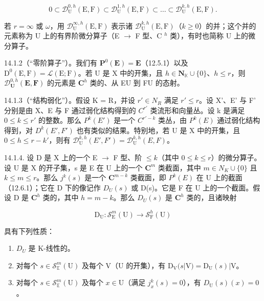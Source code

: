 \[
0 \subset \mathcal {D} _ {\mathrm{U}} ^ {0, h} (\mathrm{E}, \mathrm{F}) \subset \mathcal {D} _ {\mathrm{U}} ^ {1, h} (\mathrm{E}, \mathrm{F}) \subset \dots \subset \mathcal {D} _ {\mathrm{U}} ^ {k, h} (\mathrm{E}, \mathrm{F}).
\]

若 \(r=\infty\) 或 \(\omega\)，用 \(\mathcal{D}_{\mathrm{U}}^{\infty,h}(\mathrm{E},\mathrm{F})\) 表示诸 \(\mathcal{D}_{\mathrm{U}}^{k,h}(\mathrm{E},\mathrm{F})\)（\(k\geqslant0\)）的并；这个并的元素称为 U 上的有界阶微分算子（E \(\rightarrow\) F 型、C \(^{h}\) 类），有时也简称 U 上的微分算子。

14.1.2（“零阶算子”）。我们有 \(\mathbf{P}^0 (\mathbf{E}) = \mathbf{E}\)（12.5.1）以及 \(\mathrm{D}^0 (\mathrm{E},\mathrm{F}) = \mathcal{L}(\mathrm{E};\mathrm{F})\)。若 U 是 X 中的开集，且 \(h\in \mathbf{N}_{\mathbb{K}}\cup \{0\}\)、\(h\leqslant r\)，则 \(\mathcal{D}_{\mathbf{U}}^{0,h}(\mathbf{E},\mathbf{F})\) 的元素是 \(\mathbf{C}^h\) 类的、从 E\textbar U 到 F\textbar U 的态射。

14.1.3（“结构弱化”）。假设 K = R，并设 \(r' \in N_{R}\) 满足 \(r' \leqslant r\)。设 X'、E' 与 F' 分别是由 X、E 与 F 通过弱化结构得到的 \(C^{r'}\) 类流形和向量丛。设 k 是满足 \(0 \leqslant k \leqslant r'\) 的整数。那么 \(P^{k}(E')\) 是一个 \(C^{r'-k}\) 类丛，由 \(P^{k}(E)\) 通过弱化结构得到，对 \(D^{k}(E', F')\) 也有类似的结果。特别地，若 U 是 X 中的开集，且 \(0 \leqslant h \leqslant r - k'\)，则有 \(\mathcal{D}_{\mathrm{U}}^{k,h}(E', F') = \mathcal{D}_{\mathrm{U}}^{k,h}(E, F)\)。

14.1.4. 设 D 是 X 上的一个 E \(\to\) F 型、阶 \(\leqslant k\)（其中 \(0 \leqslant k \leqslant r\)）的微分算子。设 U 是 X 的开子集，s 是 E 在 U 上的一个 \(\mathbf{C}^{m}\) 类截面，其中 \(m \in N _{K} \cup \{0\}\) 且 \(k \leqslant m \leqslant r\)。那么 \(j^{k}(s)\) 是一个 \(\mathbf{C}^{m-k}\) 类截面，即 \(P^{k}(E)\) 在 U 上的截面（12.6.1）；它在 D 下的像记作 \(D_{U}(s)\) 或 D(s)。它是 F 在 U 上的一个截面。假设 D 是 \(\mathbf{C}^{h}\) 类的，其中 \(h=m-k\)。那么 \(D_{U}(s)\) 是 \(\mathbf{C}^{h}\) 类的，且诸映射

\[
\mathrm{D} _ {\mathrm{U}} \colon \mathcal {S} _ {\mathrm{E}} ^ {m} (\mathrm{U}) \rightarrow \mathcal {S} _ {\mathrm{F}} ^ {h} (\mathrm{U})
\]

具有下列性质：

\begin{enumerate}
\def\labelenumi{(\arabic{enumi})}
\item
  \(D_{U}\) 是 K-线性的。
\item
  对每个 \(s \in \mathcal{S}_{\mathbb{E}}^{m}(\mathrm{U})\) 及每个 \(\mathrm{V}\)（\(\mathrm{U}\) 的开集），有 \(\mathrm{D}_{\mathrm{V}}(s|\mathrm{V}) = \mathrm{D}_{\mathrm{U}}(s)|\mathrm{V}\)。
\item
  对每个 \(s \in \mathcal{S}_{\mathbb{E}}^{m}(\mathrm{U})\) 及每个 \(x \in \mathrm{U}\)（满足 \(j_{x}^{k}(s) = 0\)），有 \(D_{\mathrm{U}}(s)(x) = 0\)。
\end{enumerate}

